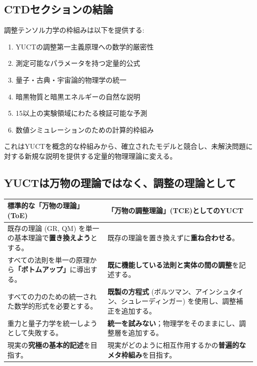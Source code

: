 \documentclass[11pt,a4paper]{article}
\begin{document}
	\subsection{CTDセクションの結論}
	
	調整テンソル力学の枠組みは以下を提供する:
	\begin{enumerate}
		\item YUCTの調整第一主義原理への数学的厳密性
		\item 測定可能なパラメータを持つ定量的公式
		\item 量子・古典・宇宙論的物理学の統一
		\item 暗黒物質と暗黒エネルギーの自然な説明
		\item 15以上の実験領域にわたる検証可能な予測
		\item 数値シミュレーションのための計算的枠組み
	\end{enumerate}
	
	これはYUCTを概念的な枠組みから、確立されたモデルと競合し、未解決問題に対する新規な説明を提供する定量的物理理論に変える。
	
	\subsection{YUCTは万物の理論ではなく、調整の理論として}
	\label{subsec:not-toe}
	
	\begin{tcolorbox}[title=YUCT vs 標準的な万物の理論 (ToE), 
		colback=blue!5!white, colframe=blue!50!black, 
		fonttitle=\bfseries, sharp corners]
		\small
		
			\begin{table}[H]
				\centering
				\begin{tabular}{p{0.45\textwidth} p{}}
					\toprule
					\textbf{標準的な「万物の理論」(ToE)} & \textbf{「万物の調整理論」(TCE)としてのYUCT} \\
					\midrule
					既存の理論 (GR, QM) を単一の基本理論で\textbf{置き換えよう}とする。 & 既存の理論を置き換えずに\textbf{重ね合わせる}。 \\
					\addlinespace
					すべての法則を単一の原理から\textbf{「ボトムアップ」}に導出する。 & \textbf{既に機能している法則と実体の間の調整}を記述する。 \\
					\addlinespace
					すべての力のための統一された数学的形式を必要とする。 & \textbf{既製の方程式} (ボルツマン、アインシュタイン、シュレーディンガー) を使用し、調整補正を追加する。 \\
					\addlinespace
					重力と量子力学を統一しようとして失敗する。 & \textbf{統一を試みない}；物理学をそのままにし、調整層を追加する。 \\
					\addlinespace
					現実の\textbf{究極の基本的記述}を目指す。 & 現実がどのように相互作用するかの\textbf{普遍的なメタ枠組み}を目指す。 \\
					\bottomrule
				\end{tabular}
			\end{table}
		
	\end{tcolorbox}
	
\end{document}
